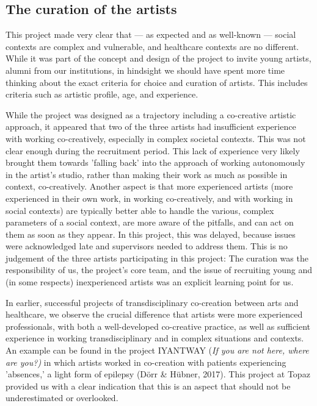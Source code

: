\documentclass[authordate, empirical]{jote-new-article}
\begin{document}
	\subsection{The curation of the artists}



	This project made very clear that --- as expected and as well-known --- social contexts are complex and vulnerable, and healthcare contexts are no different. While it was part of the concept and design of the project to invite young artists, alumni from our institutions, in hindsight we should have spent more time thinking about the exact criteria for choice and curation of artists. This includes criteria such as artistic profile, age, and experience.



	While the project was designed as a trajectory including a co-creative artistic approach, it appeared that two of the three artists had insufficient experience with working co-creatively, especially in complex societal contexts. This was not clear enough during the recruitment period. This lack of experience very likely brought them towards 'falling back' into the approach of working autonomously in the artist's studio, rather than making their work as much as possible in context, co-creatively. Another aspect is that more experienced artists (more experienced in their own work, in working co-creatively, and with working in social contexts) are typically better able to handle the various, complex parameters of a social context, are more aware of the pitfalls, and can act on them as soon as they appear. In this project, this was delayed, because issues were acknowledged late and supervisors needed to address them. This is no judgement of the three artists participating in this project: The curation was the responsibility of us, the project's core team, and the issue of recruiting young and (in some respects) inexperienced artists was an explicit learning point for us.



	In earlier, successful projects of transdisciplinary co-creation between arts and healthcare, we observe the crucial difference that artists were more experienced professionals, with both a well-developed co-creative practice, as well as sufficient experience in working transdisciplinary and in complex situations and contexts. An example can be found in the project IYANTWAY (\emph{If you are not here, where are you?) }in which artists worked in co-creation with patients experiencing 'absences,' a light form of epilepsy (Dörr \& Hübner, 2017). This project at Topaz provided us with a clear indication that this is an aspect that should not be underestimated or overlooked.
\end{document}
